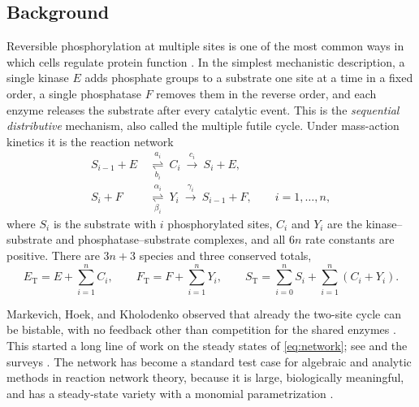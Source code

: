 \documentclass[11pt]{article}
\theoremstyle{plain}
\theoremstyle{definition}
\theoremstyle{remark}
\numberwithin{equation}{section}
\newcommand{\ET}{E_{\mathrm T}}
\newcommand{\FT}{F_{\mathrm T}}
\newcommand{\ST}{S_{\mathrm T}}
\begin{document}
\subsection{Background}
Reversible phosphorylation at multiple sites is one of the most common ways in which cells
regulate protein function \cite{Cohen2000,SalazarHofer2009}. In the simplest mechanistic
description, a single kinase \(E\) adds phosphate groups to a substrate one site at a time in a
fixed order, a single phosphatase \(F\) removes them in the reverse order, and each enzyme
releases the substrate after every catalytic event. This is the \emph{sequential distributive}
mechanism, also called the multiple futile cycle. Under mass-action kinetics it is the reaction
network
\begin{equation}\label{eq:network}
\begin{aligned}
 S_{i-1}+E &\ \underset{b_i}{\overset{a_i}{\rightleftharpoons}}\ C_i
       \ \xrightarrow{\ c_i\ }\ S_i+E,\\[3pt]
 S_i+F &\ \underset{\beta_i}{\overset{\alpha_i}{\rightleftharpoons}}\ Y_i
       \ \xrightarrow{\ \gamma_i\ }\ S_{i-1}+F,
       \qquad i=1,\dots,n,
\end{aligned}
\end{equation}
where \(S_i\) is the substrate with \(i\) phosphorylated sites, \(C_i\) and \(Y_i\) are the
kinase--substrate and phosphatase--substrate complexes, and all \(6n\) rate constants are
positive. There are \(3n+3\) species and three conserved totals,
\begin{equation}\label{eq:totals}
 \ET=E+\sum_{i=1}^n C_i,\qquad
 \FT=F+\sum_{i=1}^n Y_i,\qquad
 \ST=\sum_{i=0}^n S_i+\sum_{i=1}^n(C_i+Y_i).
\end{equation}

Markevich, Hoek, and Kholodenko observed that already the two-site cycle can be bistable, with
no feedback other than competition for the shared enzymes \cite{Markevich2004}. This started a
long line of work on the steady states of \eqref{eq:network}; see
\cite{Gunawardena2005,ConradiFlockerziRaisch2008,ThomsonGunawardena2009,FeliuWiuf2012,
HolsteinFlockerziConradi2013,ConradiMincheva2014,HellRendall2015,CFMW2017,BihanDickensteinGiaroli2020,
FKdWY2022,TorresFeliu2021} and the surveys \cite{ConradiShiu2018,Dickenstein2016,Dickenstein2020}.
The network has become a standard test case for algebraic and analytic methods in reaction
network theory, because it is large, biologically meaningful, and has a steady-state variety
with a monomial parametrization \cite{PDSC2012}.
\end{document}
